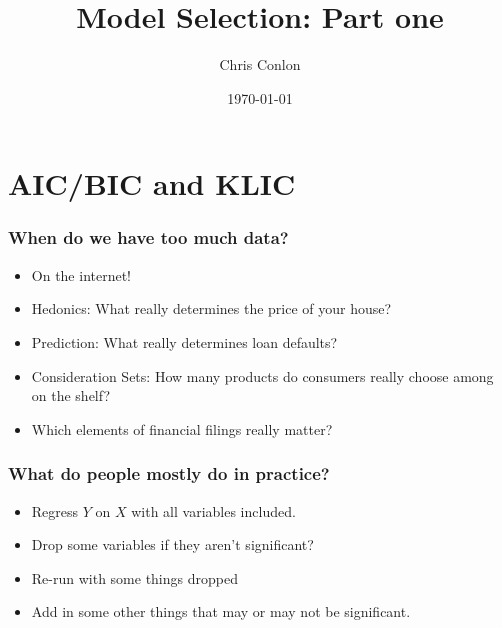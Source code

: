 \documentclass[aspectratio=169,11pt]{beamer}
\title{Model Selection: Part one}
\author{Chris Conlon}
\institute{Applied Econometrics}
\date{\today}
\begin{document}
\frame{\titlepage}
\section{AIC/BIC and KLIC}


\begin{frame}
\frametitle{When do we have too much data?}
\begin{itemize}
\item On the internet!
\item Hedonics: What really determines the price of your house?
\item Prediction: What really determines loan defaults?
\item Consideration Sets: How many products do consumers really choose among on the shelf?
\item Which elements of financial filings really matter?
\end{itemize}
\end{frame}


\begin{frame}
\frametitle{What do people mostly do in practice?}
\begin{itemize}
\item Regress $Y$ on $X$ with all variables included.
\item Drop some variables if they aren't significant?
\item Re-run with some things dropped
\item Add in some other things that may or may not be significant.
\end{itemize}
\end{frame}
\end{document}
